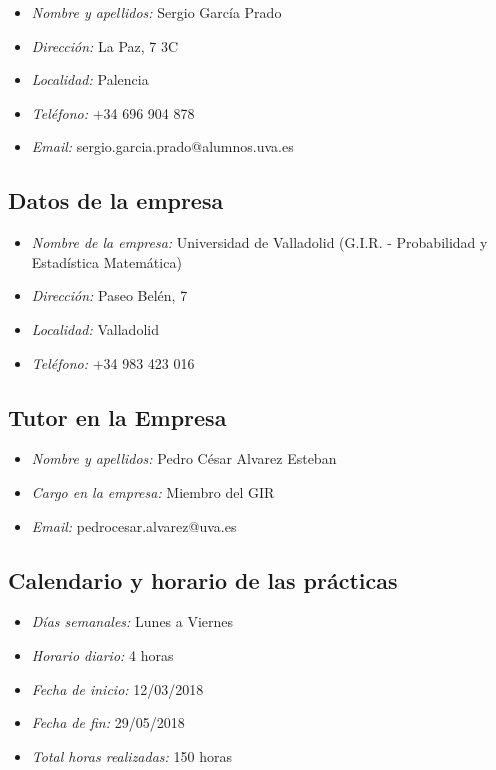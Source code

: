 \documentclass[11pt,a4paper,spanish]{article}
\begin{document}
      \begin{itemize}
        \item \emph{Nombre y apellidos:} Sergio García Prado
        \item \emph{Dirección:} La Paz, 7 3C
        \item \emph{Localidad:} Palencia
        \item \emph{Teléfono:} +34 696 904 878
        \item \emph{Email:} sergio.garcia.prado@alumnos.uva.es
      \end{itemize}


    \subsection{Datos de la empresa}

      \begin{itemize}
        \item \emph{Nombre de la empresa:} Universidad de Valladolid (G.I.R. - Probabilidad y Estadística Matemática)
        \item \emph{Dirección:} Paseo Belén, 7
        \item \emph{Localidad:} Valladolid
        \item \emph{Teléfono:} +34 983 423 016
      \end{itemize}


    \subsection{Tutor en la Empresa}

      \begin{itemize}
        \item \emph{Nombre y apellidos:} Pedro César Alvarez Esteban
        \item \emph{Cargo en la empresa:} Miembro del GIR
        \item \emph{Email:} pedrocesar.alvarez@uva.es
      \end{itemize}


    \subsection{Calendario y horario de las prácticas}

      \begin{itemize}
        \item \emph{Días semanales:} Lunes a Viernes
        \item \emph{Horario diario:} 4 horas
        \item \emph{Fecha de inicio:} 12/03/2018
        \item \emph{Fecha de fin:} 29/05/2018
        \item \emph{Total horas realizadas:} 150 horas
      \end{itemize}
\end{document}
